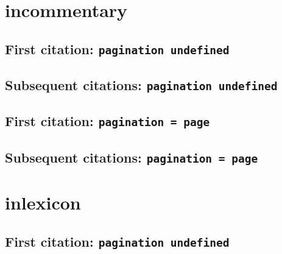 \documentclass[a4paper]{article}
\begin{document}
\cite{freedman:1980:a}

\cite[14]{freedman:1980:a}

\cite[note]{freedman:1980:a}

\section{incommentary}

\subsection{First citation: \texttt{pagination undefined}}

\cite{miller:2001}

\citereset
\cite[577]{miller:2001}

\citereset
\cite[note]{miller:2001}

\subsection{Subsequent citations: \texttt{pagination undefined}}

\cite{miller:2001}

\cite[577]{miller:2001}

\AtNextCite{\renewcommand*{\volcitedelim}{\addcomma\space}}
\cite[note]{miller:2001}

\subsection{First citation: \texttt{pagination = page}}

\cite{miller:2001:a}

\citereset
\cite[577]{miller:2001:a}

\citereset
\cite[note]{miller:2001:a}

\subsection{Subsequent citations: \texttt{pagination = page}}

\cite{miller:2001:a}

\cite[577]{miller:2001:a}

\cite[note]{miller:2001:a}

\section{inlexicon}

\subsection{First citation: \texttt{pagination undefined}}
\end{document}
